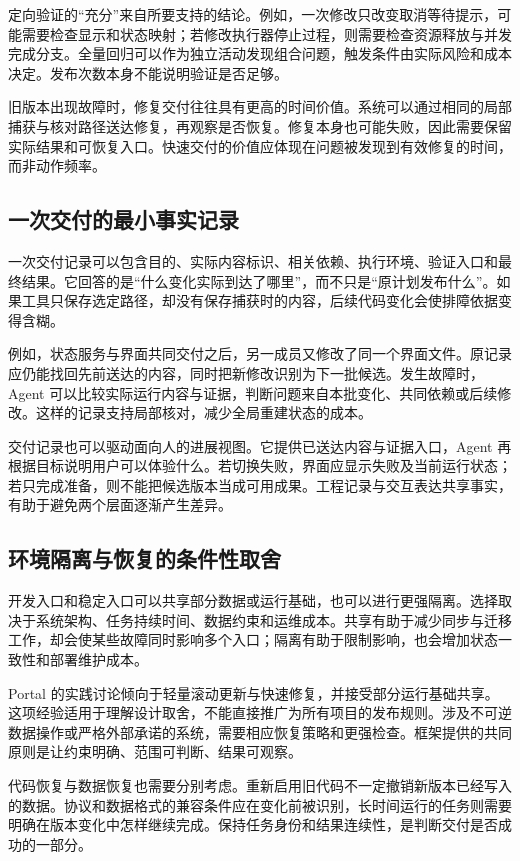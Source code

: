 定向验证的“充分”来自所要支持的结论。例如，一次修改只改变取消等待提示，可能需要检查显示和状态映射；若修改执行器停止过程，则需要检查资源释放与并发完成分支。全量回归可以作为独立活动发现组合问题，触发条件由实际风险和成本决定。发布次数本身不能说明验证是否足够。

旧版本出现故障时，修复交付往往具有更高的时间价值。系统可以通过相同的局部捕获与核对路径送达修复，再观察是否恢复。修复本身也可能失败，因此需要保留实际结果和可恢复入口。快速交付的价值应体现在问题被发现到有效修复的时间，而非动作频率。

\subsection{一次交付的最小事实记录}
一次交付记录可以包含目的、实际内容标识、相关依赖、执行环境、验证入口和最终结果。它回答的是“什么变化实际到达了哪里”，而不只是“原计划发布什么”。如果工具只保存选定路径，却没有保存捕获时的内容，后续代码变化会使排障依据变得含糊。

例如，状态服务与界面共同交付之后，另一成员又修改了同一个界面文件。原记录应仍能找回先前送达的内容，同时把新修改识别为下一批候选。发生故障时，Agent 可以比较实际运行内容与证据，判断问题来自本批变化、共同依赖或后续修改。这样的记录支持局部核对，减少全局重建状态的成本。

交付记录也可以驱动面向人的进展视图。它提供已送达内容与证据入口，Agent 再根据目标说明用户可以体验什么。若切换失败，界面应显示失败及当前运行状态；若只完成准备，则不能把候选版本当成可用成果。工程记录与交互表达共享事实，有助于避免两个层面逐渐产生差异。

\subsection{环境隔离与恢复的条件性取舍}
开发入口和稳定入口可以共享部分数据或运行基础，也可以进行更强隔离。选择取决于系统架构、任务持续时间、数据约束和运维成本。共享有助于减少同步与迁移工作，却会使某些故障同时影响多个入口；隔离有助于限制影响，也会增加状态一致性和部署维护成本。

Portal 的实践讨论倾向于轻量滚动更新与快速修复，并接受部分运行基础共享。这项经验适用于理解设计取舍，不能直接推广为所有项目的发布规则。涉及不可逆数据操作或严格外部承诺的系统，需要相应恢复策略和更强检查。框架提供的共同原则是让约束明确、范围可判断、结果可观察。

代码恢复与数据恢复也需要分别考虑。重新启用旧代码不一定撤销新版本已经写入的数据。协议和数据格式的兼容条件应在变化前被识别，长时间运行的任务则需要明确在版本变化中怎样继续完成。保持任务身份和结果连续性，是判断交付是否成功的一部分。

